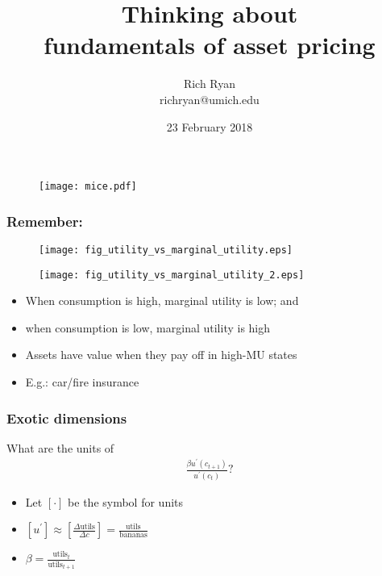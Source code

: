 \documentclass[presentation]{beamer}
\author{Rich Ryan \\ richryan@umich.edu}
\date{23 February 2018}
\title{Thinking about \\ fundamentals of asset pricing}
\begin{document}
\maketitle

\begin{frame}
\begin{figure}[htbp]
\centerline{\texttt{[image: mice.pdf]}}
\end{figure}
\end{frame}

\begin{frame}
\frametitle{Remember:}
\begin{figure}
\centering
\begin{minipage}{.5\textwidth}
  \centering
  \texttt{[image: fig\_utility\_vs\_marginal\_utility.eps]}
\end{minipage}%
\begin{minipage}{.5\textwidth}
  \centering
  \texttt{[image: fig\_utility\_vs\_marginal\_utility\_2.eps]}
\end{minipage}
\end{figure}
\begin{itemize}
\item When consumption is high, marginal utility is low; and
\item when consumption is low, marginal utility is high
\item Assets have value when they pay off in high-MU states
\item E.g.: car/fire insurance
\end{itemize}
\end{frame}

\begin{frame}
\frametitle{Exotic dimensions}

What are the units of
\begin{align*}
\frac{\beta u^{\prime}(c_{t+1})}{u^{\prime}(c_{t})}?
\end{align*}
\begin{itemize}
\item Let $\left[ \cdot \right]$ be the symbol for units
\item $\left[ u^{\prime} \right] \approx \left[ \frac{\Delta \text{utils}}{\Delta c} \right] = \frac{\text{utils}}{\text{bananas}}$
\item $\beta = \frac{\text{utils}_{t}}{\text{utils}_{t+1}}$
\end{itemize}
\end{frame}
\end{document}

